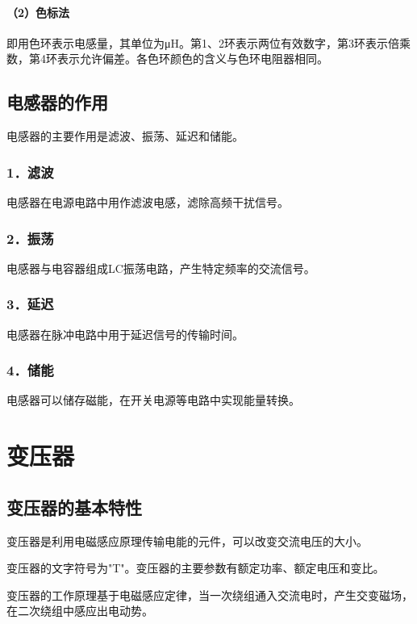 \documentclass[12pt,UTF8]{ctexbook}
\begin{document}
\paragraph{（2）色标法}
即用色环表示电感量，其单位为μH。第1、2环表示两位有效数字，第3环表示倍乘数，第4环表示允许偏差。各色环颜色的含义与色环电阻器相同。

\subsection{电感器的作用}

电感器的主要作用是滤波、振荡、延迟和储能。

\subsubsection{1．滤波}

电感器在电源电路中用作滤波电感，滤除高频干扰信号。

\subsubsection{2．振荡}

电感器与电容器组成LC振荡电路，产生特定频率的交流信号。

\subsubsection{3．延迟}

电感器在脉冲电路中用于延迟信号的传输时间。

\subsubsection{4．储能}

电感器可以储存磁能，在开关电源等电路中实现能量转换。

\section{变压器}

\subsection{变压器的基本特性}

变压器是利用电磁感应原理传输电能的元件，可以改变交流电压的大小。

变压器的文字符号为"T"。变压器的主要参数有额定功率、额定电压和变比。

变压器的工作原理基于电磁感应定律，当一次绕组通入交流电时，产生交变磁场，在二次绕组中感应出电动势。
\end{document}
